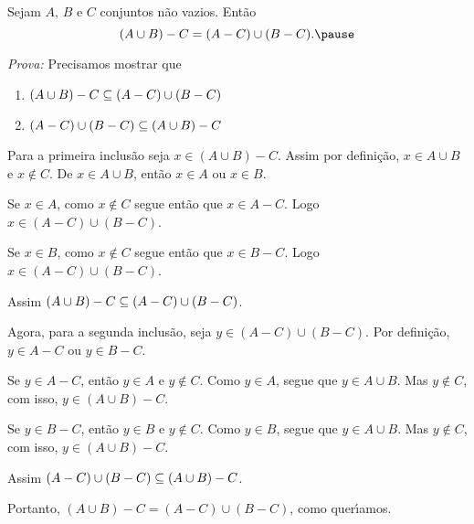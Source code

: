 \documentclass{beamer}
\begin{document}
    \begin{frame}
        \begin{proposicao}
            Sejam $A$, $B$ e $C$ \pause conjuntos n\~ao vazios. Ent\~ao\pause
            \[
                (A \cup B) - C = (A - C) \cup (B - C).\pause
            \]
        \end{proposicao}
        \textit{Prova: }\pause
        Precisamos mostrar que\pause
        \begin{enumerate}[label={\arabic*})]
            \item $(A \cup B) - C \subseteq (A - C) \cup (B - C)$\pause
            \item $(A - C) \cup (B - C) \subseteq  (A \cup B) - C$\pause
        \end{enumerate}
        Para a primeira inclus\~ao \pause seja $x \in (A \cup B) - C$. \pause Assim por defini\c{c}\~ao, \pause $x \in A \cup B$ \pause e $x \notin C$. \pause De $x \in A \cup B$, \pause ent\~ao $x \in A$ ou $x \in B$.\pause
        
        Se $x \in A$, \pause como $x \notin C$ \pause segue ent\~ao que $x \in A - C$. \pause Logo $x \in (A - C) \cup (B - C)$.\pause

        Se $x \in B$, \pause como $x \notin C$ \pause segue ent\~ao que $x \in B - C$. \pause Logo $x \in (A - C) \cup (B - C)$.\pause
    \end{frame}

    \begin{frame}
        Assim $(A \cup B) - C \subseteq (A - C) \cup (B - C)$.\pause
        
        Agora, para a segunda inclus\~ao, \pause seja $y \in (A - C) \cup (B - C)$. \pause Por defini\c{c}\~ao, \pause $y \in A - C$ ou $y \in B - C$.\pause

        Se $y \in A - C$, \pause ent\~ao $y \in A$ e $y \notin C$. \pause Como $y \in A$, \pause segue que $y \in A \cup B$. \pause Mas $y \notin C$, \pause com isso, $y \in (A \cup B) - C$.\pause

        Se $y \in B - C$, \pause ent\~ao $y \in B$ \pause e $y \notin C$. \pause Como $y \in B$, \pause segue que $y \in A \cup B$. \pause Mas $y \notin C$, \pause com isso, $y \in (A \cup B) - C$.\pause
        
        Assim $(A - C) \cup (B - C) \subseteq (A \cup B) - C$.\pause

        Portanto, \pause $(A \cup B) - C = (A - C) \cup (B - C)$, \pause como quer{\'\i}amos.\qedsymbol
    \end{frame}
\end{document}
